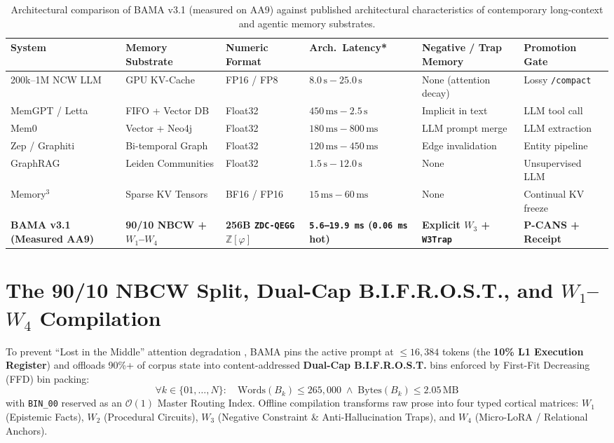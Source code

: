 \documentclass[10pt,twocolumn,letterpaper]{article}
\begin{document}
\begin{table}[t]
\centering
\caption{Architectural comparison of BAMA v3.1 (measured on AA9) against published architectural characteristics of contemporary long-context and agentic memory substrates.}
\footnotesize
\begin{tabular}{@{}llllll@{}}
\toprule
\textbf{System} & \textbf{Memory Substrate} & \textbf{Numeric Format} & \textbf{Arch.\ Latency*} & \textbf{Negative / Trap Memory} & \textbf{Promotion Gate} \\
\midrule
200k--1M NCW LLM & GPU KV-Cache & FP16 / FP8 & $8.0\,\text{s} - 25.0\,\text{s}$ & None (attention decay) & Lossy \texttt{/compact} \\
MemGPT / Letta \cite{packer2023memgpt} & FIFO + Vector DB & Float32 & $450\,\text{ms} - 2.5\,\text{s}$ & Implicit in text & LLM tool call \\
Mem0 \cite{chhikara2025mem0} & Vector + Neo4j & Float32 & $180\,\text{ms} - 800\,\text{ms}$ & LLM prompt merge & LLM extraction \\
Zep / Graphiti \cite{rasmussen2025zep} & Bi-temporal Graph & Float32 & $120\,\text{ms} - 450\,\text{ms}$ & Edge invalidation & Entity pipeline \\
GraphRAG \cite{edge2024graphrag} & Leiden Communities & Float32 & $1.5\,\text{s} - 12.0\,\text{s}$ & None & Unsupervised LLM \\
Memory$^3$ \cite{yang2024memory3} & Sparse KV Tensors & BF16 / FP16 & $15\,\text{ms} - 60\,\text{ms}$ & None & Continual KV freeze \\
\textbf{BAMA v3.1 (Measured AA9)} & \textbf{90/10 NBCW + $W_1$--$W_4$} & \textbf{256B \texttt{ZDC-QEGG} $\mathbb{Z}[\varphi]$} & \textbf{\texttt{5.6--19.9\,ms} (\texttt{0.06\,ms} hot)} & \textbf{Explicit $W_3$ + \texttt{W3Trap}} & \textbf{P-CANS + Receipt} \\
\bottomrule
\end{tabular}
\label{tab:related_work}
\end{table}

\section{The 90/10 NBCW Split, Dual-Cap B.I.F.R.O.S.T., and $W_1$--$W_4$ Compilation}
To prevent ``Lost in the Middle'' attention degradation \cite{liu2024lost}, BAMA pins the active prompt at $\le 16,384$ tokens (the \textbf{10\% L1 Execution Register}) and offloads 90\%+ of corpus state into content-addressed \textbf{Dual-Cap B.I.F.R.O.S.T.} bins enforced by First-Fit Decreasing (FFD) bin packing:
\begin{equation}
\forall k \in \{01,\dots,N\}:\quad \text{Words}(B_k) \le 265{,}000 \;\wedge\; \text{Bytes}(B_k) \le 2.05\,\text{MB}
\end{equation}
with \texttt{BIN\_00} reserved as an $\mathcal{O}(1)$ Master Routing Index. Offline compilation transforms raw prose into four typed cortical matrices: $W_1$ (Epistemic Facts), $W_2$ (Procedural Circuits), $W_3$ (Negative Constraint \& Anti-Hallucination Traps), and $W_4$ (Micro-LoRA / Relational Anchors).
\end{document}
